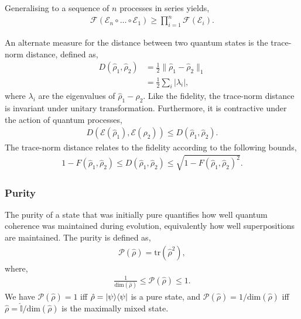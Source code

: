 Generalising to a sequence of $n$ processes in series yields,
\begin{align}
\mathcal{F}(\mathcal{E}_n\circ\dots\circ\mathcal{E}_1) \geq \prod_{i=1}^n \mathcal{F}(\mathcal{E}_i).
\end{align}

An alternate measure for the distance between two quantum states is the trace-norm distance, defined as,
\begin{align}
D(\hat\rho_1,\hat\rho_2) &= \frac{1}{2}\|\hat\rho_1 - \hat\rho_2\|_1 \nonumber\\
&= \frac{1}{2}\sum_i |\lambda_i|,
\end{align}
where $\lambda_i$ are the eigenvalues of \mbox{$\hat\rho_1-\hat\rho_2$}. Like the fidelity, the trace-norm distance is invariant under unitary transformation. Furthermore, it is contractive under the action of quantum processes,
\begin{align}
D(\mathcal{E}(\hat\rho_1),\mathcal{E}(\hat\rho_2)) \leq D(\hat\rho_1,\hat\rho_2).
\end{align}
The trace-norm distance relates to the fidelity according to the following bounds,
\begin{align}
1-F(\hat\rho_1,\hat\rho_2) \leq D(\hat\rho_1,\hat\rho_2) \leq \sqrt{1-F(\hat\rho_1,\hat\rho_2)^2}.
\end{align}

%
%

\subsubsection{Purity} 

The purity of a state that was initially pure quantifies how well quantum coherence was maintained during evolution, equivalently how well superpositions are maintained. The purity is defined as,
\begin{align}
\mathcal{P}(\hat\rho) = \text{tr}(\hat\rho^2),
\end{align}
where,
\begin{align}
\frac{1}{\text{dim}(\hat\rho)} \leq \mathcal{P}(\hat\rho) \leq 1.
\end{align}
We have \mbox{$\mathcal{P}(\hat\rho) = 1$} iff \mbox{$\hat\rho=|\psi\rangle\langle\psi|$} is a pure state, and \mbox{$\mathcal{P}(\hat\rho)=1/\text{dim}(\hat\rho)$} iff \mbox{$\hat\rho=\mathbb{\hat{I}}/\text{dim}(\hat\rho)$} is the maximally mixed state.

